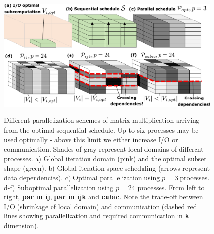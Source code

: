 \documentclass[sigplan,review,anonymous]{acmart}\settopmatter{printfolios=true,printccs=false,printacmref=false}
\begin{document}
\begin{figure}
	\includegraphics[width=\columnwidth]{figures/mmm_parallelization}
	\label{fig:mmmParallelization}
	\caption{Different parallelization schemes of matrix 
	multiplication 
		arriving from the optimal sequential schedule. Up to 
		six processes may 
		be 
		used optimally - above this limit we either increase 
		I/O or 
		communication. 
		Shades of gray represent local domains of different 
		processes. a) 
		Global 
		iteration domain (pink) and the optimal subset shape 
		(green). b) Global 
		iteration space scheduling (arrows represent data 
		dependencies). c) 
		Optimal 
		parallelization using $p=3$ processes. d-f) 
		Suboptimal parallelization 
		using $p=24$ processes. From left to right, 
		\textbf{par in ij}, 
		\textbf{par 
			in ijk} and \textbf{cubic}. Note the trade-off 
			between I/O 
		(shrinkage of 
		local domain) and communication (dashed red lines 
		showing 
		parallelization 
		and required communication in \textbf{k} dimension).} 
\end{figure}
\end{document}

